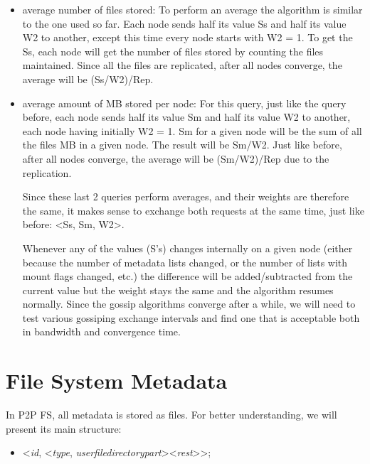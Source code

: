\documentclass[times,9pt,article]{llncs}
\begin{document}
\begin{itemize}
\item average number of files stored:
To perform an average the algorithm is similar to the one used so far. Each node
sends half its value Ss and half its value W2 to another, except this time every 
node starts with W2 = 1. To get the Ss, each node will get the number of files 
stored by counting the files maintained. Since all the files are replicated, after
all nodes converge, the average will be (Ss/W2)/Rep.

\item average amount of MB stored per node:
For this query, just like the query before, each node sends half its value Sm and 
half its value W2 to another, each node having initially W2 = 1. Sm for a given node
will be the sum of all the files MB in a given node. The result will be Sm/W2. Just
like before, after all nodes converge, the average will be (Sm/W2)/Rep due to the 
replication.

Since these last 2 queries perform averages, and their weights are therefore the same,
it makes sense to exchange both requests at the same time, just like before:
\textless Ss, Sm, W2\textgreater.

Whenever any of the values (S's) changes internally on a given node (either because
the number of metadata lists changed, or the number of lists with mount flags changed,
etc.) the difference will be added/subtracted from the current value but the weight 
stays the same and the algorithm resumes normally.
Since the gossip algorithms converge after a while, we will need to test various
gossiping exchange intervals and find one that is acceptable both in bandwidth and
convergence time.

\end{itemize} 

\section{File System Metadata}


In P2P FS, all metadata is stored as files. For better understanding, we will
present its main structure:
\begin{itemize}
\item \textless \emph{id}, \textless \emph{type}, \emph{user}\textbar \emph{file}\textbar \emph{directory}\textbar \emph{part}\textgreater \textless \emph{rest}\textgreater\textgreater ;
\end{itemize}
\end{document}
